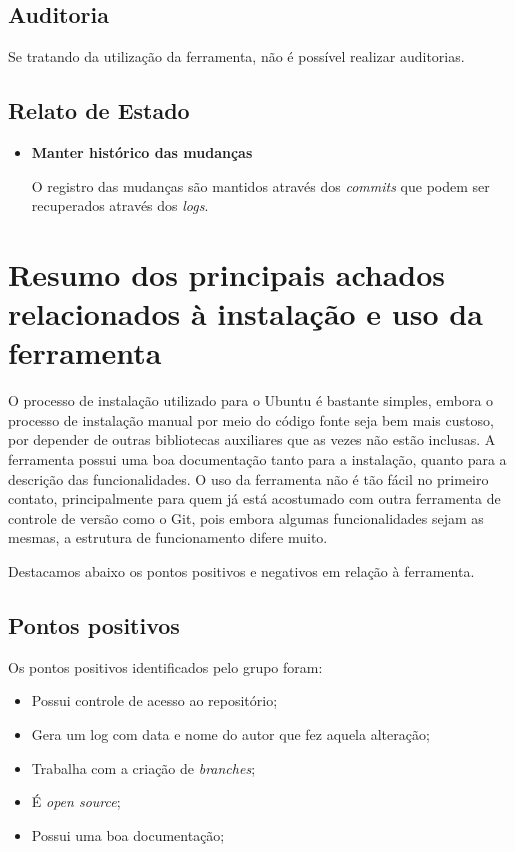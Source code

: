  \subsection{Auditoria}
  
  Se tratando da utilização da ferramenta, não é possível realizar auditorias.
  
 \subsection{Relato de Estado}
 \begin{itemize}
  \item \textbf{Manter histórico das mudanças}
  
  O registro das mudanças são mantidos através dos \textit{commits} que podem ser recuperados através dos \textit{logs}.
  
 \end{itemize}
\section{Resumo dos principais achados relacionados à instalação e uso da ferramenta}

	O processo de instalação utilizado para o Ubuntu é bastante simples, embora o processo de instalação manual por meio do 
	código fonte seja bem mais custoso, por depender de outras bibliotecas auxiliares que as vezes não estão inclusas.
	A ferramenta possui uma boa documentação tanto para a instalação, quanto para a descrição das funcionalidades.
	O uso da ferramenta não é tão fácil no primeiro contato, principalmente para quem já está acostumado com outra ferramenta 
	de controle de versão como o Git, pois embora algumas funcionalidades sejam as mesmas, a estrutura de funcionamento difere muito.

	Destacamos abaixo os pontos positivos e negativos em relação à ferramenta.

	\subsection{Pontos positivos}

			Os pontos positivos identificados pelo grupo foram:

			\begin{itemize}
				\item Possui controle de acesso ao repositório;
				\item Gera um log com data e nome do autor que fez aquela alteração;
				\item Trabalha com a criação de \textit{branches};
				\item É \textit{open source};
				\item Possui uma boa documentação;
			\end{itemize}


